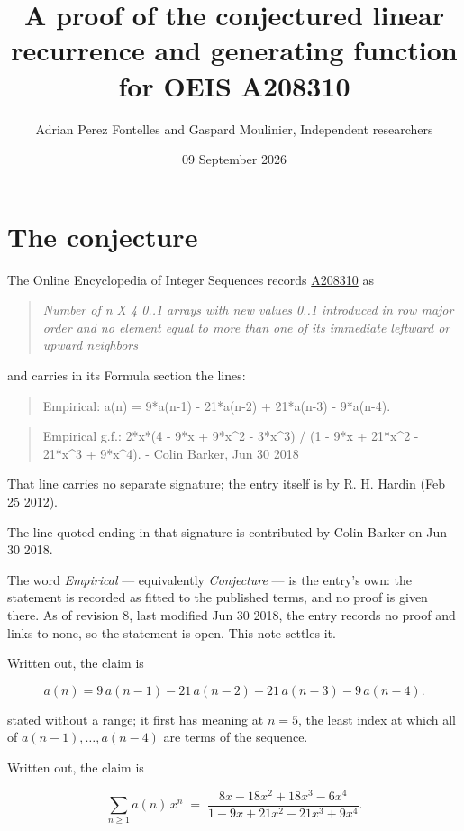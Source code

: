 \documentclass[11pt]{article}
\title{A proof of the conjectured linear recurrence and generating function for OEIS A208310}
\author{Adrian Perez Fontelles and Gaspard Moulinier, Independent researchers}
\date{09 September 2026}
\theoremstyle{definition}
\begin{document}
\maketitle
\section{The conjecture}

The Online Encyclopedia of Integer Sequences records \href{https://oeis.org/A208310}{A208310} as

\begin{quote}\itshape Number of n X 4 0..1 arrays with new values 0..1 introduced in row major order and no element equal to more than one of its immediate leftward or upward neighbors\end{quote}

and carries in its Formula section the lines:

\begin{quote}\ttfamily Empirical: a(n) = 9*a(n-1) - 21*a(n-2) + 21*a(n-3) - 9*a(n-4).\end{quote}

\begin{quote}\ttfamily Empirical g.f.: 2*x*(4 - 9*x + 9*x\textasciicircum{}2 - 3*x\textasciicircum{}3) / (1 - 9*x + 21*x\textasciicircum{}2 - 21*x\textasciicircum{}3 + 9*x\textasciicircum{}4). - Colin Barker, Jun 30 2018\end{quote}

That line carries no separate signature; the entry itself is by R. H. Hardin (Feb 25 2012).

The line quoted ending in that signature is contributed by Colin Barker on Jun 30 2018.

The word {\itshape Empirical} --- equivalently {\itshape Conjecture} --- is the entry's own: the statement is recorded as fitted to the published terms, and no proof is given there. As of revision 8, last modified Jun 30 2018, the entry records no proof and links to none, so the statement is open. This note settles it.

Written out, the claim is

\[a(n) = 9\,a(n-1) - 21\,a(n-2) + 21\,a(n-3) - 9\,a(n-4).\]

stated without a range; it first has meaning at $n = 5$, the least index at which all of $a(n-1),\dots,a(n-4)$ are terms of the sequence.

Written out, the claim is

\[\sum_{n \ge 1} a(n)\,x^n \;=\; \frac{8x - 18x^{2} + 18x^{3} - 6x^{4}}{1 - 9x + 21x^{2} - 21x^{3} + 9x^{4}}.\]
\end{document}
